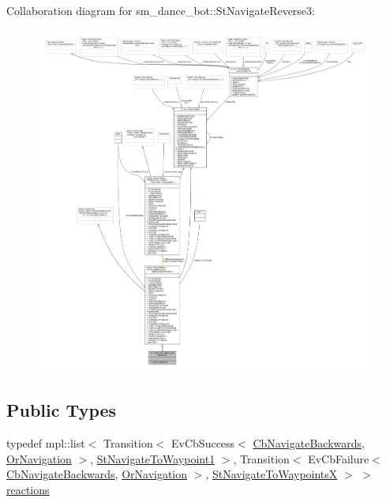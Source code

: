 Collaboration diagram for sm\+\_\+dance\+\_\+bot\+:\+:St\+Navigate\+Reverse3\+:
\nopagebreak
\begin{figure}[H]
\begin{center}
\leavevmode
\includegraphics[width=350pt]{structsm__dance__bot_1_1StNavigateReverse3__coll__graph}
\end{center}
\end{figure}
\subsection*{Public Types}
\begin{DoxyCompactItemize}
\item 
typedef mpl\+::list$<$ Transition$<$ Ev\+Cb\+Success$<$ \hyperlink{classcl__move__base__z_1_1CbNavigateBackwards}{Cb\+Navigate\+Backwards}, \hyperlink{classsm__dance__bot_1_1OrNavigation}{Or\+Navigation} $>$, \hyperlink{structsm__dance__bot_1_1StNavigateToWaypoint1}{St\+Navigate\+To\+Waypoint1} $>$, Transition$<$ Ev\+Cb\+Failure$<$ \hyperlink{classcl__move__base__z_1_1CbNavigateBackwards}{Cb\+Navigate\+Backwards}, \hyperlink{classsm__dance__bot_1_1OrNavigation}{Or\+Navigation} $>$, \hyperlink{structsm__dance__bot_1_1StNavigateToWaypointsX}{St\+Navigate\+To\+WaypointsX} $>$ $>$ \hyperlink{structsm__dance__bot_1_1StNavigateReverse3_a8cb2887a228ce50b43ccc963cc6f73d6}{reactions}
\end{DoxyCompactItemize}
